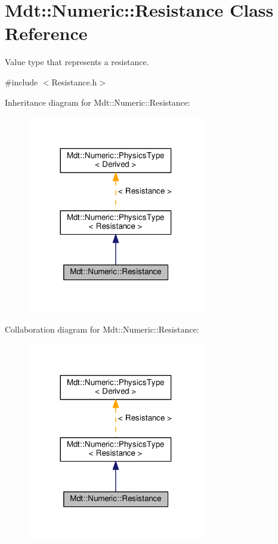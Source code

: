 \hypertarget{class_mdt_1_1_numeric_1_1_resistance}{}\section{Mdt\+:\+:Numeric\+:\+:Resistance Class Reference}
\label{class_mdt_1_1_numeric_1_1_resistance}


Value type that represents a resistance.  




{\ttfamily \#include $<$Resistance.\+h$>$}



Inheritance diagram for Mdt\+:\+:Numeric\+:\+:Resistance\+:
\nopagebreak
\begin{figure}[H]
\begin{center}
\leavevmode
\includegraphics[width=221pt]{class_mdt_1_1_numeric_1_1_resistance__inherit__graph}
\end{center}
\end{figure}


Collaboration diagram for Mdt\+:\+:Numeric\+:\+:Resistance\+:
\nopagebreak
\begin{figure}[H]
\begin{center}
\leavevmode
\includegraphics[width=221pt]{class_mdt_1_1_numeric_1_1_resistance__coll__graph}
\end{center}
\end{figure}
